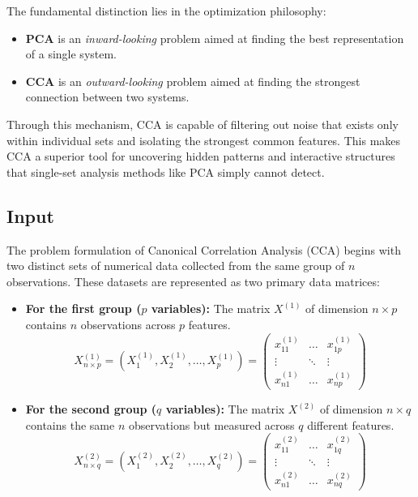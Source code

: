 The fundamental distinction lies in the optimization philosophy:
\begin{itemize}
    \item \textbf{PCA} is an \textit{inward-looking} problem aimed at finding the best representation of a single system.
    \item \textbf{CCA} is an \textit{outward-looking} problem aimed at finding the strongest connection between two systems.
\end{itemize}

Through this mechanism, CCA is capable of filtering out noise that exists only within individual sets and isolating the strongest common features. This makes CCA a superior tool for uncovering hidden patterns and interactive structures that single-set analysis methods like PCA simply cannot detect.


\subsection{ Input}

The problem formulation of Canonical Correlation Analysis (CCA) begins with two distinct sets of numerical data collected from the same group of $n$ observations. These datasets are represented as two primary data matrices:

\begin{itemize}
    \item \textbf{For the first group ($p$ variables):} The matrix $X^{(1)}$ of dimension $n \times p$ contains $n$ observations across $p$ features.
    \begin{equation}
    X_{n\times p}^{(1)} = \left( X_1^{(1)}, X_2^{(1)}, \dots, X_p^{(1)} \right) = 
    \begin{pmatrix} 
    x_{11}^{(1)} & \dots & x_{1p}^{(1)} \\ 
    \vdots & \ddots & \vdots \\ 
    x_{n1}^{(1)} & \dots & x_{np}^{(1)} 
    \end{pmatrix}
    \end{equation}

    \item \textbf{For the second group ($q$ variables):} The matrix $X^{(2)}$ of dimension $n \times q$ contains the same $n$ observations but measured across $q$ different features.
    \begin{equation}
    X_{n\times q}^{(2)} = \left( X_1^{(2)}, X_2^{(2)}, \dots, X_q^{(2)} \right) = 
    \begin{pmatrix} 
    x_{11}^{(2)} & \dots & x_{1q}^{(2)} \\ 
    \vdots & \ddots & \vdots \\ 
    x_{n1}^{(2)} & \dots & x_{nq}^{(2)} 
    \end{pmatrix}
    \end{equation}
\end{itemize}

